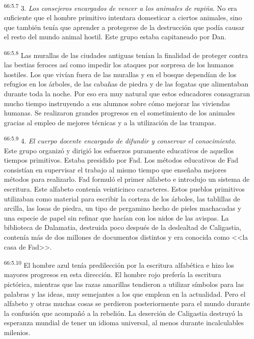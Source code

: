 \par
\textsuperscript{66:5.7} 3. \textit{Los consejeros encargados de vencer a los animales de rapiña}. No era suficiente que el hombre primitivo intentara domesticar a ciertos animales, sino que también tenía que aprender a protegerse de la destrucción que podía causar el resto del mundo animal hostil. Este grupo estaba capitaneado por Dan.

\par
\textsuperscript{66:5.8} Las murallas de las ciudades antiguas tenían la finalidad de proteger contra las bestias feroces así como impedir los ataques por sorpresa de los humanos hostiles. Los que vivían fuera de las murallas y en el bosque dependían de los refugios en los árboles, de las cabañas de piedra y de las fogatas que alimentaban durante toda la noche. Por eso era muy natural que estos educadores consagraran mucho tiempo instruyendo a sus alumnos sobre cómo mejorar las viviendas humanas. Se realizaron grandes progresos en el sometimiento de los animales gracias al empleo de mejores técnicas y a la utilización de las trampas.

\par
\textsuperscript{66:5.9} 4. \textit{El cuerpo docente encargado de difundir y conservar el conocimiento}. Este grupo organizó y dirigió los esfuerzos puramente educativos de aquellos tiempos primitivos. Estaba presidido por Fad. Los métodos educativos de Fad consistían en supervisar el trabajo al mismo tiempo que enseñaba mejores métodos para realizarlo. Fad formuló el primer alfabeto e introdujo un sistema de escritura. Este alfabeto contenía veinticinco caracteres. Estos pueblos primitivos utilizaban como material para escribir la corteza de los árboles, las tablillas de arcilla, las losas de piedra, un tipo de pergamino hecho de pieles machacadas y una especie de papel sin refinar que hacían con los nidos de las avispas. La biblioteca de Dalamatia, destruida poco después de la deslealtad de Caligastia, contenía más de dos millones de documentos distintos y era conocida como <<la casa de Fad>>.

\par
\textsuperscript{66:5.10} El hombre azul tenía predilección por la escritura alfabética e hizo los mayores progresos en esta dirección. El hombre rojo prefería la escritura pictórica, mientras que las razas amarillas tendieron a utilizar símbolos para las palabras y las ideas, muy semejantes a los que emplean en la actualidad. Pero el alfabeto y otras muchas cosas se perdieron posteriormente para el mundo durante la confusión que acompañó a la rebelión. La deserción de Caligastia destruyó la esperanza mundial de tener un idioma universal, al menos durante incalculables milenios.

